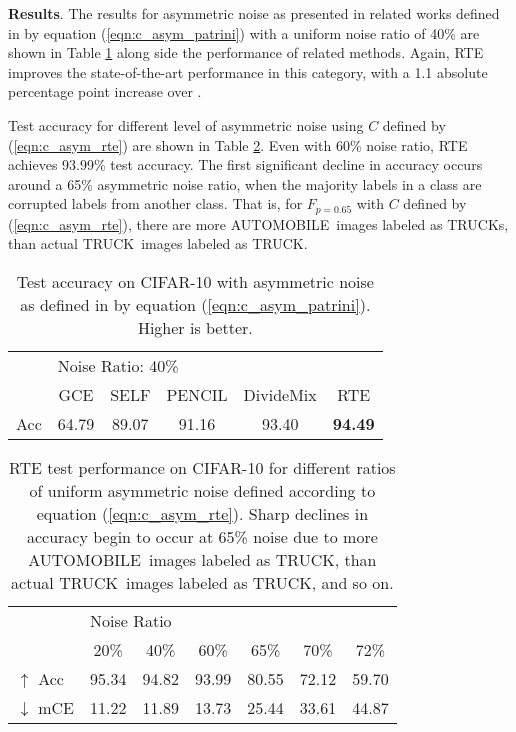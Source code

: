 \documentclass{article}
\renewcommand{\b}[1]{\textbf{#1}}
\begin{document}
\textbf{Results}.
The results for asymmetric noise as presented in related works defined in \cite{patrini2016} by equation (\ref{eqn:c_asym_patrini}) with a uniform noise ratio of 40\% are shown in Table \ref{tab:asym_results_patrini} along side the performance of related methods. Again, RTE improves the state-of-the-art performance in this category, with a 1.1 absolute percentage point increase over \cite{li2020}.

Test accuracy for different level of asymmetric noise using $C$ defined by (\ref{eqn:c_asym_rte}) are shown in Table \ref{tab:asym_results_ours}. Even with 60\% noise ratio, RTE achieves 93.99\% test accuracy. The first significant decline in accuracy occurs around a 65\% asymmetric noise ratio, when the majority labels in a class are corrupted labels from another class. That is, for $F_{p=0.65}$ with $C$ defined by (\ref{eqn:c_asym_rte}), there are more \small{AUTOMOBILE}\normalsize \, images labeled as \small{TRUCK}\normalsize s, than actual \small{TRUCK}\normalsize \, images labeled as \small{TRUCK}\normalsize .

\begin{table}
\renewcommand{\arraystretch}{1.3}
    \centering
    \caption{Test accuracy on CIFAR-10 with asymmetric noise as defined in \cite{patrini2016} by equation (\ref{eqn:c_asym_patrini}).  Higher is better.}\begin{tabular}{lccccc}
        \toprule & \multicolumn{4}{l}{Noise Ratio: 40\%} \\ 
        & GCE \cite{zhang2018} & SELF \cite{nguyen2020}  & PENCIL \cite{yi2019} & DivideMix \cite{li2020} & RTE \\
        \hline
        Acc    & 64.79 & 89.07 & 91.16 & 93.40 & \b{94.49}  \\
        \bottomrule
    \end{tabular}
    \label{tab:asym_results_patrini}
\end{table}

\begin{table}
\renewcommand{\arraystretch}{1.3}
    \centering
    \caption{RTE test performance on CIFAR-10 for different ratios of uniform asymmetric noise defined according to equation (\ref{eqn:c_asym_rte}).  Sharp declines in accuracy begin to occur at 65\% noise due to more \small{AUTOMOBILE}\normalsize \,  images labeled as \small{TRUCK}\normalsize, than actual \small{TRUCK}\normalsize \, images labeled as \small{TRUCK}\normalsize, and so on.}\begin{tabular}{lcccccc}
        \toprule
& \multicolumn{6}{l}{Noise Ratio} \\ 
        & 20\% & 40\% & 60\% & 65\% & 70\% & 72\%\\
        \hline
        $\uparrow$ Acc & 95.34 & 94.82 & 93.99 & 80.55 & 72.12 & 59.70\\
        $\downarrow$ mCE    & 11.22 & 11.89 & 13.73 & 25.44 & 33.61 & 44.87 \\
        \bottomrule
    \end{tabular}
    \label{tab:asym_results_ours}
\end{table}
\end{document}

